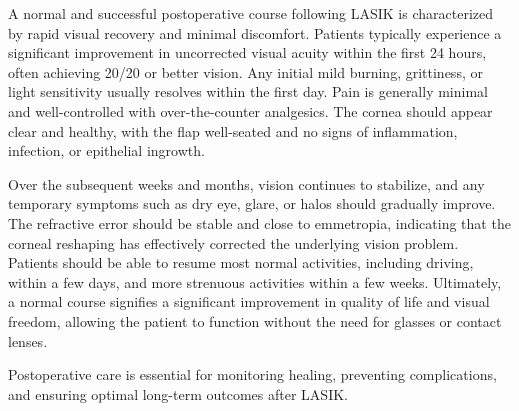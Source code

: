 A normal and successful postoperative course following LASIK is characterized by rapid visual recovery and minimal discomfort. Patients typically experience a significant improvement in uncorrected visual acuity within the first 24 hours, often achieving 20/20 or better vision. Any initial mild burning, grittiness, or light sensitivity usually resolves within the first day. Pain is generally minimal and well-controlled with over-the-counter analgesics. The cornea should appear clear and healthy, with the flap well-seated and no signs of inflammation, infection, or epithelial ingrowth.

Over the subsequent weeks and months, vision continues to stabilize, and any temporary symptoms such as dry eye, glare, or halos should gradually improve. The refractive error should be stable and close to emmetropia, indicating that the corneal reshaping has effectively corrected the underlying vision problem. Patients should be able to resume most normal activities, including driving, within a few days, and more strenuous activities within a few weeks. Ultimately, a normal course signifies a significant improvement in quality of life and visual freedom, allowing the patient to function without the need for glasses or contact lenses.

Postoperative care is essential for monitoring healing, preventing complications, and ensuring optimal long-term outcomes after LASIK.


